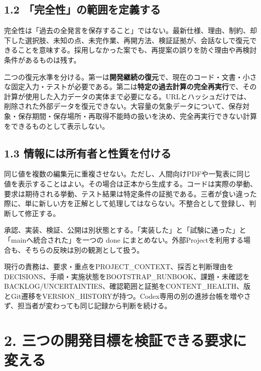 \documentclass[11pt,a4paper]{article}
\begin{document}
\subsection{1.2
「完全性」の範囲を定義する}\label{ux5b8cux5168ux6027ux306eux7bc4ux56f2ux3092ux5b9aux7fa9ux3059ux308b}

完全性は「過去の全発言を保存すること」ではない。最新仕様、理由、制約、却下した選択肢、未知の点、未完作業、再開方法、検証証拠が、会話なしで復元できることを意味する。採用しなかった案でも、再提案の誤りを防ぐ理由や再検討条件があるものは残す。

二つの復元水準を分ける。第一は\textbf{開発継続の復元}で、現在のコード・文書・小さな固定入力・テストが必要である。第二は\textbf{特定の過去計算の完全再実行}で、その計算が使用した入力データの実体まで必要になる。URLとハッシュだけでは、削除された外部データを復元できない。大容量の気象データについて、保存対象・保存期間・保存場所・再取得不能時の扱いを決め、完全再実行できない計算をできるものとして表示しない。

\subsection{1.3
情報には所有者と性質を付ける}\label{ux60c5ux5831ux306bux306fux6240ux6709ux8005ux3068ux6027ux8ceaux3092ux4ed8ux3051ux308b}

同じ値を複数の編集元に重複させない。ただし、人間向けPDFや一覧表に同じ値を表示することはよい。その場合は正本から生成する。コードは実際の挙動、要求は期待される挙動、テスト結果は特定条件の証拠である。三者が食い違った際に、単に新しい方を正解として処理してはならない。不整合として登録し、判断して修正する。

承認、実装、検証、公開は別状態とする。「実装した」と「試験に通った」と「mainへ統合された」を一つの
done
にまとめない。外部Projectを利用する場合も、そちらの反映は別の観測として扱う。

現行の責務は、要求・重点をPROJECT\_CONTEXT、採否と判断理由をDECISIONS、手順・実施状態をBOOTSTRAP\_RUNBOOK、課題・未確認をBACKLOG/UNCERTAINTIES、確認範囲と証拠をCONTENT\_HEALTH、版とGit遷移をVERSION\_HISTORYが持つ。Codex専用の別の進捗台帳を増やさず、担当者が変わっても同じ記録から判断を続ける。

\section{2.
三つの開発目標を検証できる要求に変える}\label{ux4e09ux3064ux306eux958bux767aux76eeux6a19ux3092ux691cux8a3cux3067ux304dux308bux8981ux6c42ux306bux5909ux3048ux308b}
\end{document}
